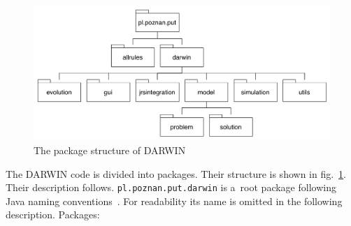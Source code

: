\begin{figure}
  \centering \includegraphics[scale=0.45]{img/packages}
  \caption{The package structure of DARWIN}
  \label{packages}
\end{figure}

The DARWIN code is divided into packages. Their structure is shown in
fig.~\ref{packages}. Their description follows. \texttt{pl.poznan.put.darwin}
is a~root package following Java naming conventions~\cite{JCC}. For
readability its name is omitted in the following description. Packages:
